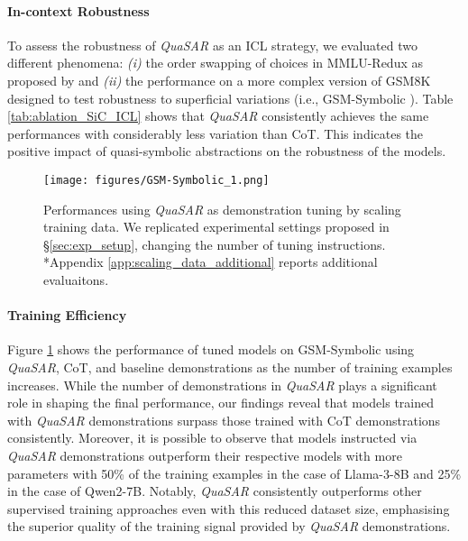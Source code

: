 \documentclass[11pt]{article}
\newcommand{\QuaSAR}{\emph{QuaSAR}\xspace}
\begin{document}
\paragraph{In-context Robustness}
To assess the robustness of \QuaSAR as an ICL strategy, we evaluated two different phenomena: \textit{(i)} the order swapping of choices in MMLU-Redux \cite{gema2024we} as proposed by \citet{leang2024comatchainmathematicallyannotated} and \textit{(ii)} the performance on a more complex version of GSM8K designed to test robustness to superficial variations (i.e., GSM-Symbolic \cite{mirzadeh2024gsmsymbolicunderstandinglimitationsmathematical}). Table \ref{tab:ablation_SiC_ICL} shows that \QuaSAR consistently achieves the same performances with considerably less variation than CoT. This indicates the positive impact of quasi-symbolic abstractions on the robustness of the models.

\begin{figure}[t]
    \centering    \texttt{[image: figures/GSM-Symbolic\_1.png]}
    \caption{Performances using \QuaSAR as demonstration tuning by scaling training data. We replicated experimental settings proposed in \S \ref{sec:exp_setup}, changing the number of tuning instructions. *Appendix \ref{app:scaling_data_additional} reports additional evaluaitons.}
    \label{fig:scaling_training_data}
\end{figure}

\paragraph{Training Efficiency}
Figure \ref{fig:scaling_training_data} shows the performance of tuned models on GSM-Symbolic \cite{mirzadeh2024gsmsymbolicunderstandinglimitationsmathematical} using \QuaSAR, CoT, and baseline demonstrations as the number of training examples increases. While the number of demonstrations in \QuaSAR plays a significant role in shaping the final performance, our findings reveal that models trained with \QuaSAR demonstrations surpass those trained with CoT demonstrations consistently. Moreover, it is possible to observe that models instructed via \QuaSAR demonstrations outperform their respective models with more parameters with 50\% of the training examples in the case of Llama-3-8B and 25\% in the case of Qwen2-7B. Notably, \QuaSAR consistently outperforms other supervised training approaches even with this reduced dataset size, emphasising the superior quality of the training signal provided by \QuaSAR demonstrations.
\end{document}
